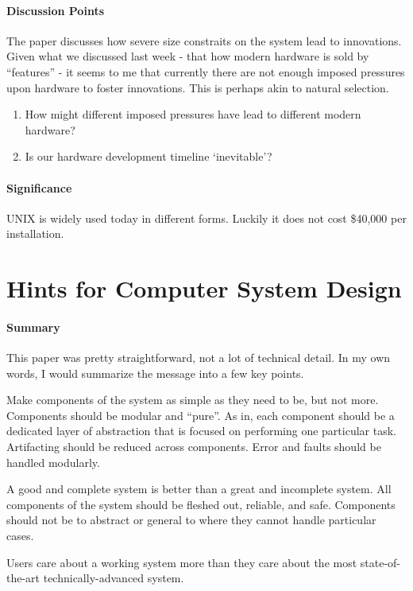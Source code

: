 \paragraph{\textbf{Discussion Points}}
The paper discusses how severe size constraits on the system lead to
innovations. Given what we discussed last week - that how modern hardware
is sold by ``features'' - it seems to me that currently there are not enough
imposed pressures upon hardware to foster innovations. This is perhaps akin
to natural selection.
\begin{enumerate}
    \item How might different imposed pressures have lead to different modern
    hardware?
    \item Is our hardware development timeline `inevitable'?
\end{enumerate}

\paragraph{\textbf{Significance}}
UNIX is widely used today in different forms. Luckily it does not cost \$40,000
per installation.

\section {Hints for Computer System Design \cite{lampson1983hints}}

\paragraph{\textbf{Summary}}
This paper was pretty straightforward, not a lot of technical detail. In my own
words, I would summarize the message into a few key points.

Make components of the system as simple as they need to be, but not more. 
Components should be modular and ``pure''. As in, each component should be a
dedicated layer of abstraction that is focused on performing one particular
task. Artifacting should be reduced across components. Error and faults should
be handled modularly.

A good and complete system is better than a great and incomplete system. All
components of the system should be fleshed out, reliable, and safe. Components
should not be to abstract or general to where they cannot handle particular
cases.

Users care about a working system more than they care about the most
state-of-the-art technically-advanced system.

